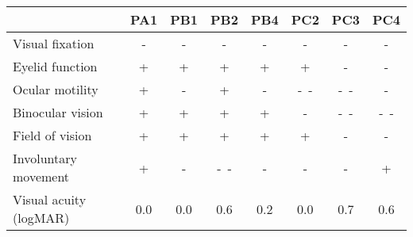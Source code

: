 \newcommand{\skill}{+}
\newcommand{\noskill}{-}
\newcommand{\snoskill}{-\ -}

\begin{tabular}{lccccccc}
  \toprule
                          & PA1      & PB1      & PB2       & PB4      & PC2       & PC3       & PC4 \\
  \midrule
  Visual fixation         & \noskill & \noskill & \noskill  & \noskill & \noskill  & \noskill  & \noskill \\
  Eyelid function         & \skill   & \skill   & \skill    & \skill   &  \skill  & \noskill  & \noskill \\
  Ocular motility         & \skill   & \noskill & \skill    & \noskill & \snoskill & \snoskill & \noskill\\
  Binocular vision        & \skill   & \skill   & \skill    & \skill   & \noskill  & \snoskill & \snoskill \\
  Field of vision         & \skill   & \skill   & \skill    & \skill   & \skill    & \noskill  & \noskill \\
  Involuntary movement    & \skill   & \noskill & \snoskill  & \noskill &  \noskill  & \noskill  & \skill \\
  \midrule
  Visual acuity (logMAR)  & 0.0      & 0.0      & 0.6       & 0.2      & 0.0       & 0.7  & 0.6\\
  \bottomrule
\end{tabular}
